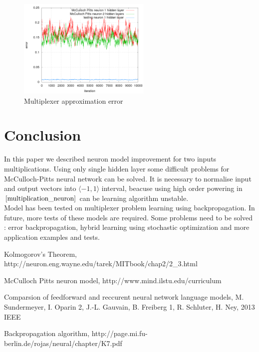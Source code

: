 \documentclass[10pt,a5paper]{article}
\begin{document}
\begin{figure}[!ht]
\centering
\includegraphics[width=2.5in]{multiplexer_result.png}
\caption{Multiplexer approximation error}
\label{multiplexer_result}
\end{figure}

\section{Conclusion}

In this paper we described neuron model improvement for
two inputs multiplications. Using only single hidden layer some
difficult problems for McCulloch-Pitts neural network can be solved.
It is necessary to normalise input and output vectors into  $\langle -1, 1 \rangle$ interval,
beacuse using high order powering in $\ref{multiplication_neuron}$ can be learning
algorithm unstable. \\
  Model has been tested on multiplexer problem learning using backpropagation.
  In future, more tests of these models are required.
  Some problems need to be solved : error backpropagation,
  hybrid learning using stochastic optimization and more application
  examples and tests.




\begin{thebibliography}{4}

 Kolmogorov's Theorem,
http://neuron.eng.wayne.edu/tarek/MITbook/chap2/2\_3.html

 McCulloch Pitts neuron model,
http://www.mind.ilstu.edu/curriculum

 Comparsion of feedforward and reccurent neural network language models,
M. Sundermeyer, I. Oparin 2, J.-L. Gauvain, B. Freiberg 1, R. Schluter, H. Ney, 2013 IEEE

 Backpropagation algorithm,
http://page.mi.fu-berlin.de/rojas/neural/chapter/K7.pdf

\end{thebibliography}
\end{document}
